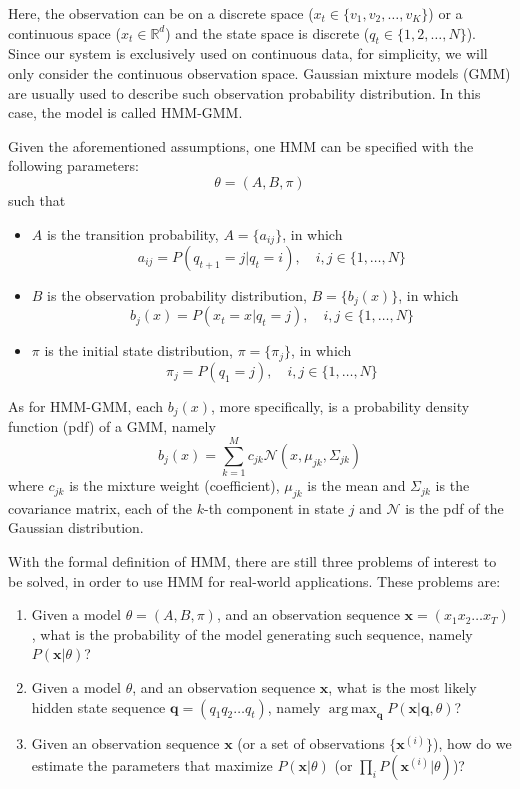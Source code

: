 \documentclass[12pt,final,twoside]{report}
\theoremstyle{plain}
\theoremstyle{definition}
\theoremstyle{remark}
\DeclareMathOperator*{\argmax}{arg\,max}
\begin{document}
Here, the observation can be on a discrete space ($x_t \in \{v_1, v_2, \dots, v_K\}$) or a continuous space ($x_t \in \mathbb{R}^d$) and the state space is discrete ($q_t \in \{1, 2, \dots, N\}$). Since our system is exclusively used on continuous data, for simplicity, we will only consider the continuous observation space. Gaussian mixture models (GMM) are usually used to describe such observation probability distribution. In this case, the model is called HMM-GMM.

Given the aforementioned assumptions, one HMM can be specified with the following parameters:
\[ \theta = (A, B, \pi) \]
such that
\begin{itemize}
  \item $A$ is the transition probability, $A = \{a_{ij}\}$, in which 
    \[ a_{ij} = P(q_{t+1} = j | q_t = i), \quad i,j \in \{1, \dots, N\} \]
  \item $B$ is the observation probability distribution, $B = \{b_j(x)\}$, in which
    \[ b_j(x) = P(x_t = x | q_t = j), \quad i,j \in \{1, \dots, N\} \]
  \item $\pi$ is the initial state distribution, $\pi = \{\pi_j\}$, in which
    \[ \pi_j = P(q_1 = j), \quad i,j \in \{1, \dots, N\} \]
\end{itemize}

As for HMM-GMM, each $b_j(x)$, more specifically, is a probability density function (pdf) of a GMM, namely
\[ b_j(x) = \sum_{k=1}^M c_{jk} \mathcal{N}(x, \mu_{jk}, \Sigma_{jk}) \]
where $c_{jk}$ is the mixture weight (coefficient), $\mu_{jk}$ is the mean and $\Sigma_{jk}$ is the covariance matrix, each of the $k$-th component in state $j$ and $\mathcal{N}$ is the pdf of the Gaussian distribution.

With the formal definition of HMM, there are still three problems of interest to be solved, in order to use HMM for real-world applications. These problems are:
\begin{enumerate}
  \item Given a model $\theta=(A, B, \pi)$, and an observation sequence $\mathbf{x} = (x_1 x_2 \dots x_T)$, what is the probability of the model generating such sequence, namely $P(\mathbf{x}|\theta)$?
  \item Given a model $\theta$, and an observation sequence $\mathbf{x}$, what is the most likely hidden state sequence $\mathbf{q} = (q_1 q_2 \dots q_t)$, namely $\argmax_{\mathbf{q}}P(\mathbf{x}|\mathbf{q},\theta)$?
  \item Given an observation sequence $\mathbf{x}$ (or a set of observations $\{\mathbf{x}^{(i)}\}$), how do we estimate the parameters that maximize $P(\mathbf{x}|\theta)$ (or $\prod_{i} P(\mathbf{x}^{(i)}|\theta) $)?
\end{enumerate}
\end{document}
